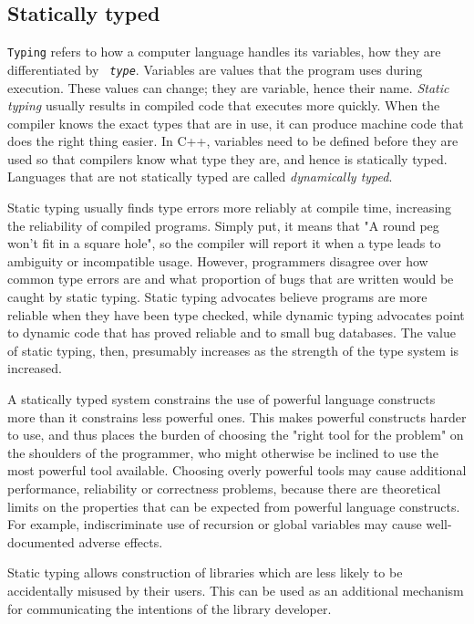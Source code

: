 \subsection{Statically typed}
\texttt{Typing} refers to how a computer language handles its variables, how
they are differentiated by \texttt{ \textit{type}}. Variables are values that the
program uses during execution. These values can change; they are variable,
hence their name.  \textit{Static typing} usually results in compiled code that
executes more quickly. When the compiler knows the exact types that are in use,
it can produce machine code that does the right thing easier. In C++, variables
need to be defined before they are used so that compilers know what type they
are, and hence is statically typed.  Languages that are not statically typed
are called  \textit{dynamically typed}.

Static typing usually finds type errors more reliably at compile time,
increasing the reliability of compiled programs. Simply put, it means that "A
round peg won't fit in a square hole", so the compiler will report it when a
type leads to ambiguity or incompatible usage. However, programmers disagree
over how common type errors are and what proportion of bugs that are written
would be caught by static typing. Static typing advocates believe programs are
more reliable when they have been type checked, while dynamic typing advocates
point to dynamic code that has proved reliable and to small bug databases. The
value of static typing, then, presumably increases as the strength of the type
system is increased.

A statically typed system constrains the use of powerful language constructs
more than it constrains less powerful ones. This makes powerful constructs
harder to use, and thus places the burden of choosing the "right tool for the
problem" on the shoulders of the programmer, who might otherwise be inclined to
use the most powerful tool available. Choosing overly powerful tools may cause
additional performance, reliability or correctness problems, because there are
theoretical limits on the properties that can
be expected from powerful language constructs. For example, indiscriminate use
of recursion or global variables may cause
well-documented adverse effects.

Static typing allows construction of libraries which are less likely to be
accidentally misused by their users. This can be used as an additional
mechanism for communicating the intentions of the library developer.

